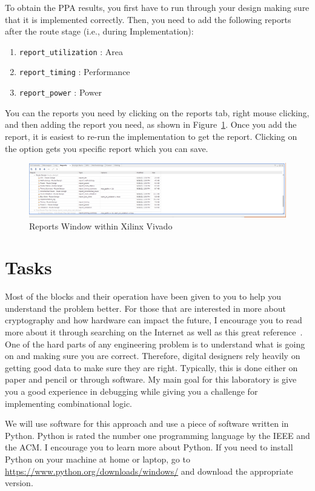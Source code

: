 \documentclass{article}
\begin{document}
To obtain the PPA results, you first have to run through your design
making sure that it is implemented correctly.  Then, you need to add
the following reports after the route stage (i.e., during
Implementation):
\begin{enumerate}
\item \verb!report_utilization! : Area
\item \verb!report_timing! : Performance
\item \verb!report_power! : Power
\end{enumerate}
You can the reports you need by clicking on the reports tab, right
mouse clicking, and then adding the report you need, as shown in
Figure~\ref{reports1.png}.  Once you add the report, it is easiest to
re-run the implementation to get the report.  Clicking on the option
gets you specific report which you can save.
\begin{figure} [b!]
  \centering
  \includegraphics[scale=0.3, width=\columnwidth]{analysis.png}
  \caption{Reports Window within Xilinx Vivado}
  \label{reports1.png}
\end{figure}

  
\section{Tasks}

Most of the blocks and their operation
have been given to you to help you understand the
problem better.
For those that are interested in more about cryptography and how
hardware can impact the future, I encourage you to read more about it
through searching on the Internet as well as this great
reference~\cite{10.5555/1721909}.
One of the hard parts of any engineering problem is
to understand what is going on and making sure you are correct.
Therefore, digital designers rely heavily on getting good data to make
sure they are right.  Typically, this is done either on paper and
pencil or through software.  My main goal for this laboratory is give
you a good experience in debugging while giving you a challenge for
implementing combinational logic.

We will use software for this approach
and use a piece of software written in Python.  Python is rated the
number one programming language by the IEEE and the ACM.  I encourage
you to learn more about Python.
If you need
to install Python on your machine at home or laptop, go to
\url{https://www.python.org/downloads/windows/} and
download the appropriate version.
\end{document}
